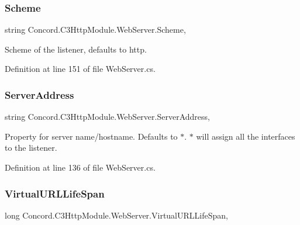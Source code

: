 \subsubsection{\texorpdfstring{Scheme}{Scheme}}
{\footnotesize\ttfamily string Concord.\+C3\+Http\+Module.\+Web\+Server.\+Scheme\hspace{0.3cm}{\ttfamily [get]}, {\ttfamily [set]}}



Scheme of the listener, defaults to http. 



Definition at line 151 of file Web\+Server.\+cs.

\mbox{\label{class_concord_1_1_c3_http_module_1_1_web_server_a9a5def732b3afd8530271b7a8de16591}} 
\subsubsection{\texorpdfstring{ServerAddress}{ServerAddress}}
{\footnotesize\ttfamily string Concord.\+C3\+Http\+Module.\+Web\+Server.\+Server\+Address\hspace{0.3cm}{\ttfamily [get]}, {\ttfamily [set]}}



Property for server name/hostname. Defaults to $\ast$. $\ast$ will assign all the interfaces to the listener. 



Definition at line 136 of file Web\+Server.\+cs.

\mbox{\label{class_concord_1_1_c3_http_module_1_1_web_server_ac992bf483d0f40c39532bb3b320f2a75}} 
\subsubsection{\texorpdfstring{VirtualURLLifeSpan}{VirtualURLLifeSpan}}
{\footnotesize\ttfamily long Concord.\+C3\+Http\+Module.\+Web\+Server.\+Virtual\+U\+R\+L\+Life\+Span\hspace{0.3cm}{\ttfamily [get]}, {\ttfamily [set]}}




